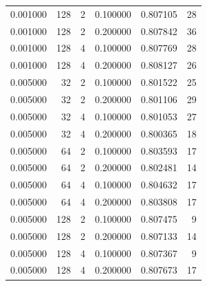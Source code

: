 \begin{longtable}{rrrrrr}
0.001000 & 128 & 2 & 0.100000 & 0.807105 & 28 \\
0.001000 & 128 & 2 & 0.200000 & 0.807842 & 36 \\
0.001000 & 128 & 4 & 0.100000 & 0.807769 & 28 \\
0.001000 & 128 & 4 & 0.200000 & 0.808127 & 26 \\
0.005000 & 32 & 2 & 0.100000 & 0.801522 & 25 \\
0.005000 & 32 & 2 & 0.200000 & 0.801106 & 29 \\
0.005000 & 32 & 4 & 0.100000 & 0.801053 & 27 \\
0.005000 & 32 & 4 & 0.200000 & 0.800365 & 18 \\
0.005000 & 64 & 2 & 0.100000 & 0.803593 & 17 \\
0.005000 & 64 & 2 & 0.200000 & 0.802481 & 14 \\
0.005000 & 64 & 4 & 0.100000 & 0.804632 & 17 \\
0.005000 & 64 & 4 & 0.200000 & 0.803808 & 17 \\
0.005000 & 128 & 2 & 0.100000 & 0.807475 & 9 \\
0.005000 & 128 & 2 & 0.200000 & 0.807133 & 14 \\
0.005000 & 128 & 4 & 0.100000 & 0.807367 & 9 \\
0.005000 & 128 & 4 & 0.200000 & 0.807673 & 17 \\
\end{longtable}
